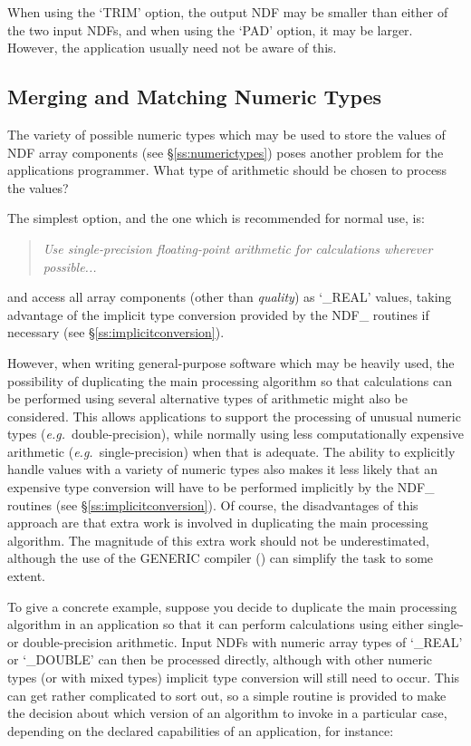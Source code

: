 \documentclass[twoside,11pt,nolof]{starlink}
\providecommand{\st}[1]{{\emph{#1}}}
\begin{document}
When using the `TRIM' option, the output NDF may be smaller than either of
the two input NDFs, and when using the `PAD' option, it may be larger.
However, the application usually need not be aware of this.

\subsection{Merging and Matching Numeric Types}

The variety of possible numeric types which may be used to store the values
of NDF array components (see \S\ref{ss:numerictypes}) poses another problem
for the applications programmer.
What type of arithmetic should be chosen to process the values?

The simplest option, and the one which is recommended for normal use, is:

\begin{quote}
\begin{center}
\st{Use single-precision floating-point arithmetic for calculations
wherever possible...}
\end{center}
\end{quote}

and access all array components (other than \st{quality\/}) as `\_REAL'
values, taking advantage of the implicit type conversion provided by the
NDF\_ routines if necessary (see \S\ref{ss:implicitconversion}).

However, when writing general-purpose software which may be heavily used,
the possibility of duplicating the main processing algorithm so that
calculations can be performed using several alternative types of arithmetic
might also be considered.
This allows applications to support the processing of unusual numeric types
(\st{e.g.}\ double-precision), while normally using less computationally
expensive arithmetic (\st{e.g.}\ single-precision) when that is adequate.
The ability to explicitly handle values with a variety of numeric types also
makes it less likely that an expensive type conversion will have to be
performed implicitly by the NDF\_ routines (see
\S\ref{ss:implicitconversion}).
Of course, the disadvantages of this approach are that extra work is
involved in duplicating the main processing algorithm.
The magnitude of this extra work should not be underestimated, although the
use of the GENERIC compiler () can simplify the
task to some extent.

To give a concrete example, suppose you decide to duplicate the main
processing algorithm in an application so that it can perform calculations
using either single- or double-precision arithmetic.
Input NDFs with numeric array types of `\_REAL' or `\_DOUBLE' can then be
processed directly, although with other numeric types (or with mixed types)
implicit type conversion will still need to occur.
This can get rather complicated to sort out, so a simple routine 
is provided to make the decision about which version of an algorithm to
invoke in a particular case, depending on the declared capabilities of an
application, for instance:
\end{document}
